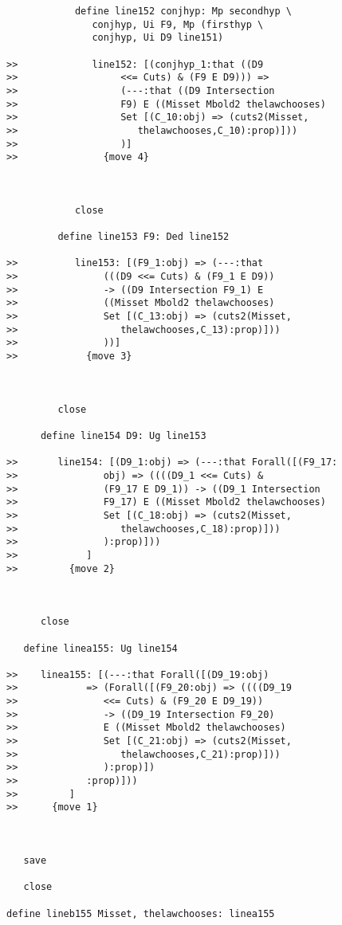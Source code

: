 \documentclass[12pt]{article}
\begin{document}
\begin{verbatim}
            define line152 conjhyp: Mp secondhyp \
               conjhyp, Ui F9, Mp (firsthyp \
               conjhyp, Ui D9 line151)

>>             line152: [(conjhyp_1:that ((D9
>>                  <<= Cuts) & (F9 E D9))) =>
>>                  (---:that ((D9 Intersection
>>                  F9) E ((Misset Mbold2 thelawchooses)
>>                  Set [(C_10:obj) => (cuts2(Misset,
>>                     thelawchooses,C_10):prop)]))
>>                  )]
>>               {move 4}



            close

         define line153 F9: Ded line152

>>          line153: [(F9_1:obj) => (---:that
>>               (((D9 <<= Cuts) & (F9_1 E D9))
>>               -> ((D9 Intersection F9_1) E
>>               ((Misset Mbold2 thelawchooses)
>>               Set [(C_13:obj) => (cuts2(Misset,
>>                  thelawchooses,C_13):prop)]))
>>               ))]
>>            {move 3}



         close

      define line154 D9: Ug line153

>>       line154: [(D9_1:obj) => (---:that Forall([(F9_17:
>>               obj) => ((((D9_1 <<= Cuts) &
>>               (F9_17 E D9_1)) -> ((D9_1 Intersection
>>               F9_17) E ((Misset Mbold2 thelawchooses)
>>               Set [(C_18:obj) => (cuts2(Misset,
>>                  thelawchooses,C_18):prop)]))
>>               ):prop)]))
>>            ]
>>         {move 2}



      close

   define linea155: Ug line154

>>    linea155: [(---:that Forall([(D9_19:obj)
>>            => (Forall([(F9_20:obj) => ((((D9_19
>>               <<= Cuts) & (F9_20 E D9_19))
>>               -> ((D9_19 Intersection F9_20)
>>               E ((Misset Mbold2 thelawchooses)
>>               Set [(C_21:obj) => (cuts2(Misset,
>>                  thelawchooses,C_21):prop)]))
>>               ):prop)])
>>            :prop)]))
>>         ]
>>      {move 1}



   save

   close

define lineb155 Misset, thelawchooses: linea155



\end{verbatim}
\end{document}
